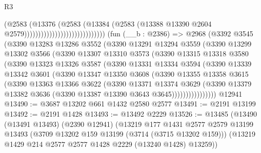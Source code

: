 \begin{lexlean}{R3}
\begin{coremodule}
                                                  (@2583
                                                    (@13376
                                                      (@2583
                                                        (@13384
                                                          (@2583
                                                            (@13388
                                                              @13390
                                                              @2604
                                                              @2579)))))))))))))))))))))))))))))
    (fun (__b : @2386) =>
    @2968
      (@3392
        @3545
        (@3390
          @13283
          @13286
          @3552
          (@3390
            @13291
            @13294
            @3559
            (@3390
              @13299
              @13302
              @3566
              (@3390
                @13307
                @13310
                @3573
                (@3390
                  @13315
                  @13318
                  @3580
                  (@3390
                    @13323
                    @13326
                    @3587
                    (@3390
                      @13331
                      @13334
                      @3594
                      (@3390
                        @13339
                        @13342
                        @3601
                        (@3390
                          @13347
                          @13350
                          @3608
                          (@3390
                            @13355
                            @13358
                            @3615
                            (@3390
                              @13363
                              @13366
                              @3622
                              (@3390
                                @13371
                                @13374
                                @3629
                                (@3390
                                  @13379
                                  @13382
                                  @3636
                                  (@3390 @13387 @13390 @3643 @3645))))))))))))))))
    @12941
@13490 := @3687 @13202 @661 @1432 @2580 @2577
@13491 := @2191 @13199
@13492 := @2191 @1428
@13493 := @13492 @2229
@13526 := @13485
    (@13490
      (@13491 @13493)
      (@2390 @12941)
      (@13219
        @177
        @1431
        @2577
        @2579
        @13199
        @13493
        (@3709 @13202 @159 @13199 (@3714 (@3715 @13202 @159)))
        (@13219 @1429 @214 @2577 @2577 @1428 @2229 (@13240 @1428) @13259))

\end{coremodule}
\end{lexlean}
